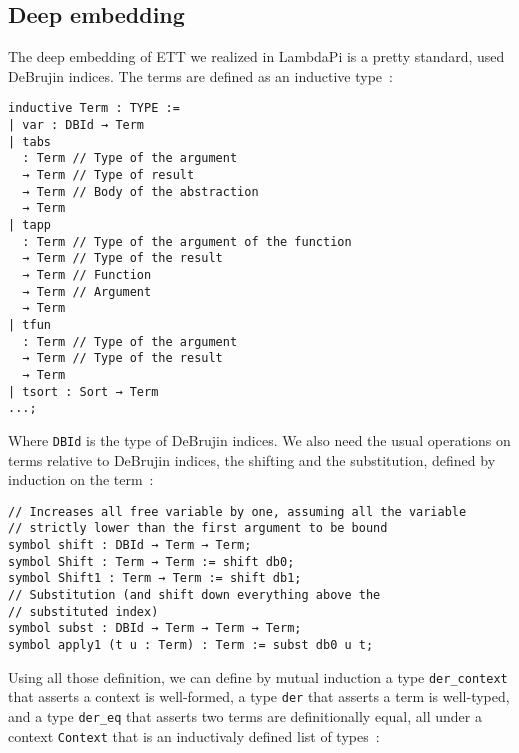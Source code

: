 \subsection{Deep embedding}\label{ETT-deep}

The deep embedding of ETT we realized in LambdaPi is a pretty standard, used
DeBrujin indices. The terms are defined as an inductive type~:

\begin{lstlisting}
inductive Term : TYPE :=
| var : DBId → Term
| tabs
  : Term // Type of the argument
  → Term // Type of result
  → Term // Body of the abstraction
  → Term
| tapp
  : Term // Type of the argument of the function
  → Term // Type of the result
  → Term // Function
  → Term // Argument
  → Term
| tfun
  : Term // Type of the argument
  → Term // Type of the result
  → Term
| tsort : Sort → Term
...;
\end{lstlisting}

Where \texttt{DBId} is the type of DeBrujin indices. We also need the usual
operations on terms relative to DeBrujin indices, the shifting and the
substitution, defined by induction on the term~:

\begin{lstlisting}
// Increases all free variable by one, assuming all the variable
// strictly lower than the first argument to be bound
symbol shift : DBId → Term → Term;
symbol Shift : Term → Term := shift db0;
symbol Shift1 : Term → Term := shift db1;
// Substitution (and shift down everything above the
// substituted index)
symbol subst : DBId → Term → Term → Term;
symbol apply1 (t u : Term) : Term := subst db0 u t;
\end{lstlisting}

Using all those definition, we can define by mutual induction a type
\texttt{der\_context} that asserts a context is well-formed, a type
\texttt{der} that asserts a term is well-typed, and a type \texttt{der\_eq}
that asserts two terms are definitionally equal, all under a context
\texttt{Context} that is an inductivaly defined list of types~:

